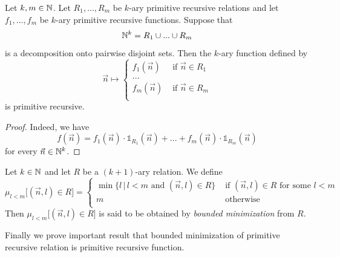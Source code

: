 \documentclass[10pt]{amsart}
\begin{document}
\begin{proposition}\label{proposition:primitive_recursive_alternative_produces_primitive_recursive_function}
	Let $k, m \in {\mathbb N}$. Let $R_1,...,R_m$ be $k$-ary primitive recursive relations  and let $f_1,...,f_m$ be $k$-ary primitive recursive functions. Suppose that
	$${\mathbb N}^k = R_1\cup... \cup R_m$$
	is a decomposition onto pairwise disjoint sets. Then the $k$-ary function defined by
	$$\vec{n} \mapsto
		\begin{cases}
			f_1(\vec{n}) & \mbox{ if }\vec{n} \in R_1 \\
			...                                       \\
			f_m(\vec{n}) & \mbox{ if }\vec{n} \in R_m \\
		\end{cases}$$
	is primitive recursive.
\end{proposition}
\begin{proof}
	Indeed, we have
	$$f(\vec{n}) = f_1(\vec{n})\cdot \mathbb{1}_{R_1}(\vec{n}) +... + f_m(\vec{n})\cdot \mathbb{1}_{R_m}(\vec{n})$$
	for every $\vec{n} \in {\mathbb N}^k$.
\end{proof}

\begin{definition}
	Let $k \in {\mathbb N}$ and let $R$ be a $(k + 1)$-ary relation. We define
	$$\mu_{l < m}\big[(\vec{n},l) \in R\big] =
		\begin{cases}
			\min \{l\,|\,l < m\mbox{ and }(\vec{n},l)\in R\} & \mbox{ if }(\vec{n},l)\in R\mbox{ for some }l < m \\
			m                                                & \mbox{ otherwise }                                \\
		\end{cases}
	$$
	Then $\mu_{l < m}\big[(\vec{n},l) \in R\big]$ is said to be obtained by \textit{bounded minimization} from $R$.
\end{definition}
\noindent
Finally we prove important result that bounded minimization of primitive recursive relation  is primitive recursive function.
\end{document}
